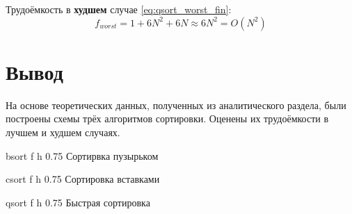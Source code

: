 Трудоёмкость в \textbf{худшем} случае \eqref{eq:qsort_worst_fin}:
\begin{equation}
    \label{eq:qsort_worst_fin}
    f_{worst} = 1 + 6N^2 + 6N \approx 6N^2 = O(N^{2})
\end{equation}
\section{Вывод}

На основе теоретических данных, полученных из аналитического раздела, были построены схемы трёх алгоритмов сортировки. Оценены их трудоёмкости в лучшем и худшем случаях.

\clearpage

{bsort} %
{f} %
{h} %
{0.75\textwidth} %
{Сортирвка пузырьком} %
\clearpage

{csort} %
{f} %
{h} %
{0.75\textwidth} %
{Сортировка вставками} %
\clearpage

{qsort} %
{f} %
{h} %
{0.75\textwidth} %
{Быстрая сортировка} %
\clearpage